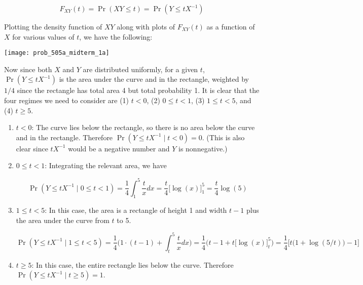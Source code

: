 \begin{enumerate}[(1)]
\begin{enumerate}[(a)]
\[
F_{XY}(t) = \Pr(XY \leq t) = \Pr(Y \leq tX^{-1})
\]

Plotting the density function of \(XY\) along with plots of \(F_{XY}(t)\) as a function of \(X\) for various values of \(t\), we have the following:

\begin{center}
    \texttt{[image: prob\_505a\_midterm\_1a]}
    \end{center}

Now since both \(X\) and \(Y\) are distributed uniformly, for a given \(t\), \( \Pr(Y \leq tX^{-1})\) is the area under the curve and in the rectangle, weighted by \(1/4\) since the rectangle has total area 4 but total probability 1. It is clear that the four regimes we need to consider are (1) \(t < 0\), (2) \(0 \leq t < 1\), (3) \(1 \leq t < 5\), and (4) \(t \geq 5\). 

\begin{enumerate}[(1)]

\item \(t < 0\): The curve lies below the rectangle, so there is no area below the curve and in the rectangle. Therefore \( \boxed{\Pr(Y \leq tX^{-1} \mid t < 0) = 0}\). (This is also clear since \(tX^{-1}\) would be a negative number and \(Y\) is nonnegative.)

\item \(0 \leq t < 1\): Integrating the relevant area, we have

\[
\Pr(Y \leq tX^{-1} \mid 0 \leq t < 1) = \frac{1}{4} \int_1^5 \frac{t}{x} dx = \frac{t}{4} \big[\log(x) \big]_1^5 = \boxed{\frac{t}{4} \log(5)}
\]

\item \(1 \leq t < 5\): In this case, the area is a rectangle of height 1 and width \(t-1\) plus the area under the curve from \(t\) to 5.

\[
\Pr(Y \leq tX^{-1} \mid 1 \leq t < 5) = \frac{1}{4} \bigg( 1 \cdot (t-1) +  \int_t^5 \frac{t}{x} dx \bigg)  = \frac{1}{4} \bigg(t -1 + t\big[\log(x) \big]_t^5 \bigg) = \boxed{\frac{1}{4} \big[t \big(1+\log(5/t) \big) - 1\big]}
\]

\item \(t \geq 5\): In this case, the entire rectangle lies below the curve. Therefore \(\boxed{\Pr(Y \leq tX^{-1} \mid t \geq 5) = 1}\).


\end{enumerate}
\end{enumerate}
\end{enumerate}

